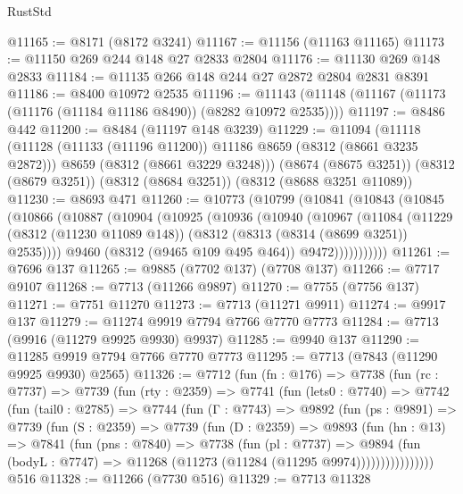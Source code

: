\begin{lexlean}{RustStd}
\begin{coremodule}
@11165 := @8171 (@8172 @3241)
@11167 := @11156 (@11163 @11165)
@11173 := @11150 @269 @244 @148 @27 @2833 @2804
@11176 := @11130 @269 @148 @2833
@11184 := @11135 @266 @148 @244 @27 @2872 @2804 @2831 @8391
@11186 := @8400 @10972 @2535
@11196 := @11143 (@11148 (@11167 (@11173 (@11176 (@11184 @11186 @8490)) (@8282 @10972 @2535))))
@11197 := @8486 @442
@11200 := @8484 (@11197 @148 @3239)
@11229 := @11094
    (@11118
      (@11128 (@11133 (@11196 @11200)) @11186 @8659 (@8312 (@8661 @3235 @2872)))
      @8659
      (@8312 (@8661 @3229 @3248)))
    (@8674 (@8675 @3251))
    (@8312 (@8679 @3251))
    (@8312 (@8684 @3251))
    (@8312 (@8688 @3251 @11089))
@11230 := @8693 @471
@11260 := @10773
    (@10799
      (@10841
        (@10843
          (@10845
            (@10866
              (@10887
                (@10904
                  (@10925
                    (@10936
                      (@10940
                        (@10967
                          (@11084
                            (@11229
                              (@8312 (@11230 @11089 @148))
                              (@8312 (@8313 (@8314 (@8699 @3251)) @2535))))
                          @9460
                          (@8312 (@9465 @109 @495 @464))
                          @9472)))))))))))
@11261 := @7696 @137
@11265 := @9885 (@7702 @137) (@7708 @137)
@11266 := @7717 @9107
@11268 := @7713 (@11266 @9897)
@11270 := @7755 (@7756 @137)
@11271 := @7751 @11270
@11273 := @7713 (@11271 @9911)
@11274 := @9917 @137
@11279 := @11274 @9919 @7794 @7766 @7770 @7773
@11284 := @7713 (@9916 (@11279 @9925 @9930) @9937)
@11285 := @9940 @137
@11290 := @11285 @9919 @7794 @7766 @7770 @7773
@11295 := @7713 (@7843 (@11290 @9925 @9930) @2565)
@11326 := @7712
    (fun (fn : @176) =>
    @7738
      (fun (rc : @7737) =>
      @7739
        (fun (rty : @2359) =>
        @7741
          (fun (lets0 : @7740) =>
          @7742
            (fun (tail0 : @2785) =>
            @7744
              (fun (Γ : @7743) =>
              @9892
                (fun (ps : @9891) =>
                @7739
                  (fun (S : @2359) =>
                  @7739
                    (fun (D : @2359) =>
                    @9893
                      (fun (hn : @13) =>
                      @7841
                        (fun (pns : @7840) =>
                        @7738
                          (fun (pl : @7737) =>
                          @9894
                            (fun (bodyL : @7747) =>
                            @11268 (@11273 (@11284 (@11295 @9974))))))))))))))))
    @516
@11328 := @11266 (@7730 @516)
@11329 := @7713 @11328

\end{coremodule}
\end{lexlean}
